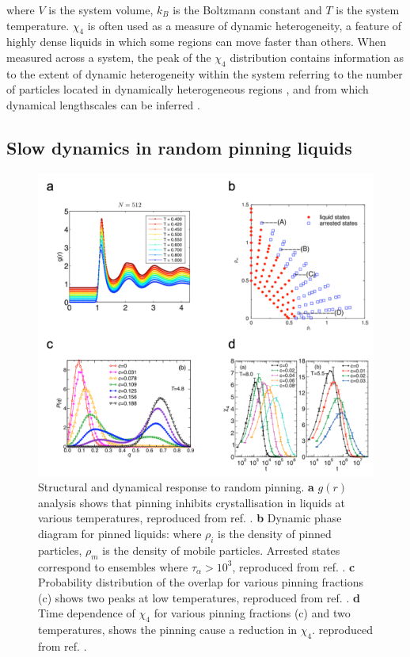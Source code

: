 \noindent where $V$ is the system volume, $k_B$ is the Boltzmann constant and $T$ is the system temperature. $\chi_4$ is often used as a measure of dynamic heterogeneity, a feature of highly dense liquids in which some regions can move faster than others. When measured across a system, the peak of the $\chi_4$ distribution contains information as to the extent of dynamic heterogeneity within the system
referring to the number of particles located in dynamically heterogeneous regions \cite{lacevic2003a}, and from which dynamical lengthscales can be inferred \cite{flenner2010}.


\subsection{Slow dynamics in random pinning liquids}
\label{section:SlowDynamics}

\begin{figure}
	\includegraphics[width=\linewidth]{chapters/colloids/figsColloids/figPinning.png}
	\caption[Structural and dynamical response to  random pinning.]{Structural and dynamical response to  random pinning. \textbf{a} $g(r)$ analysis shows that pinning inhibits crystallisation in liquids at various temperatures, reproduced from ref. \cite{karmakar2013}. \textbf{b} Dynamic phase diagram for pinned liquids: where $\rho_i$ is the density of pinned particles, $\rho_m$ is the density of mobile particles. Arrested states correspond to ensembles where $\tau_{\alpha} > 10^3$, reproduced from ref. \cite{kim2011}. \textbf{c} Probability distribution of the overlap for various pinning fractions (c) shows two peaks at low temperatures, reproduced from ref. \cite{kob2013}. \textbf{d} Time dependence of $\chi_4$ for various pinning fractions (c) and two temperatures, shows the pinning cause a reduction in $\chi_4$. reproduced from ref. \cite{kob2014}.}
	\label{fig:Pinning}
\end{figure}

